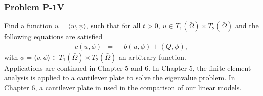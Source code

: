 \documentclass[../../main.tex]{subfiles}
\begin{document}
	\subsubsection{Problem P-1V}\label{sssec:P_Model:ProblemP1V}
	Find a function $u = \langle w, \psi \rangle$, such that for all $t>0$, $u \in T_1({\bar{\Omega}}) \times T_2({\bar{\Omega}})$ and the following equations are satisfied
	\begin{eqnarray}
		c(u,\phi) &=& -b(u,\phi) + (Q,\phi), \label{eq:P_Model:ProblemP1V1}
	\end{eqnarray} with $\phi = \langle v, \phi \rangle  \in T_1({\bar{\Omega}}) \times T_2({\bar{\Omega}})$ an arbitrary function.\\
	
	
 Applications are continued in Chapter 5 and 6. In Chapter 5, the finite element analysis is applied to a cantilever plate to solve the eigenvalue problem. In Chapter 6, a cantilever plate in used in the comparison of our linear models.
\end{document}
